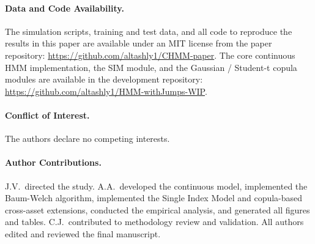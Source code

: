 \paragraph{Data and Code Availability.}
The simulation scripts, training and test data, and all code to reproduce the results in this paper are available under an MIT license from the paper repository: \url{https://github.com/altashly1/CHMM-paper}.
The core continuous HMM implementation, the SIM module, and the Gaussian / Student-t copula modules are available in the development repository: \url{https://github.com/altashly1/HMM-withJumps-WIP}.

\paragraph{Conflict of Interest.}
The authors declare no competing interests.

\paragraph{Author Contributions.}
J.V.\ directed the study.
A.A.\ developed the continuous model, implemented the Baum-Welch algorithm, implemented the Single Index Model and copula-based cross-asset extensions, conducted the empirical analysis, and generated all figures and tables.
C.J.\ contributed to methodology review and validation.
All authors edited and reviewed the final manuscript.

